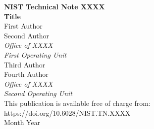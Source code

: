 \documentclass[12pt]{article}
\newcommand{\pubnumber}{XXXX}
\newcommand{\DOI}{https://doi.org/10.6028/NIST.TN.XXXX}
\newcommand{\monthyear}{Month Year}
\begin{document}
\begin{titlepage}
\begin{flushright}
\LARGE{\textbf{NIST Technical Note \pubnumber}}\\
\vfill 
\Huge{\textbf{Title}}\\
\vfill
\normalsize First Author\\
Second Author\\
\textit{Office of XXXX}\\
\textit{First Operating Unit}\\
\vspace{12pt}
Third Author\\
Fourth Author\\
\textit{Office of XXXX}\\
\textit{Second Operating Unit}\\
\vfill
\normalsize This publication is available free of charge from:\\
\DOI\\
\vfill
\normalsize \monthyear
\vfill


\end{flushright}
\end{titlepage}
\end{document}
